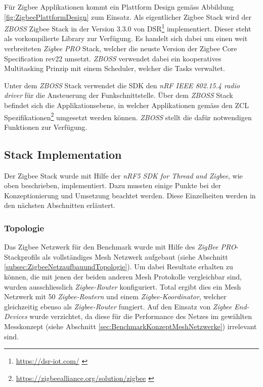 Für Zigbee Applikationen kommt ein Plattform Design gemäss Abbildung \ref{fig:ZigbeePlattformDesign} zum Einsatz. 
Als eigentlicher Zigbee Stack wird der \textit{ZBOSS} Zigbee Stack in der Version 3.3.0 von DSR\footnote{\url{https://dsr-iot.com/} \cite{dsr_corporation_dsr_nodate}} implementiert.
Dieser steht als vorkompilierte Library zur Verfügung. 
Es handelt sich dabei um einen weit verbreiteten \textit{Zigbee PRO} Stack, welcher die neuste Version der Zigbee Core Specification rev22 umsetzt.
\textit{ZBOSS} verwendet dabei ein kooperatives Multitasking Prinzip mit einem Scheduler, welcher die Tasks verwaltet.

Unter dem \textit{ZBOSS} Stack verwendet die SDK den \textit{nRF IEEE 802.15.4 radio driver} für die Ansteuerung der Funkschnittstelle.
Über dem \textit{ZBOSS} Stack befindet sich die Applikationsebene, in welcher Applikationen gemäss den ZCL Spezifikationen\footnote{\url{https://zigbeealliance.org/solution/zigbee} \cite{the_zigbee_alliance_zigbee_2016}} umgesetzt werden können.
\textit{ZBOSS} stellt die dafür notwendigen Funktionen zur Verfügung.


\subsection{Stack Implementation}\label{subsec:ZigbeeStackImplementation}
Der Zigbee Stack wurde mit Hilfe der \textit{nRF5 SDK for Thread and Zigbee}, wie oben beschrieben, implementiert.
Dazu mussten einige Punkte bei der Konzeptionierung und Umsetzung beachtet werden.
Diese Einzelheiten werden in den nächsten Abschnitten erläutert.

\subsubsection{Topologie}\label{subsubsec:ZigbeeTopologie}
Das Zigbee Netzwerk für den Benchmark wurde mit Hilfe des \textit{ZigBee PRO}-Stackprofils als vollständiges Mesh Netzwerk aufgebaut (siehe Abschnitt \ref{subsec:ZigbeeNetzaufbauundTopologie}).
Um dabei Resultate erhalten zu können, die mit jenen der beiden anderen Mesh Protokolle vergleichbar sind, wurden ausschliesslich \textit{Zigbee-Router} konfiguriert.
Total ergibt dies ein Mesh Netzwerk mit 50 \textit{Zigbee-Routern} und einem \textit{Zigbee-Koordinator}, welcher gleichzeitig ebenso als \textit{Zigbee-Router} fungiert.
Auf den Einsatz von \textit{Zigbee End-Devices} wurde verzichtet, da diese für die Performance des Netzes im gewählten Messkonzept (siehe Abschnitt \ref{sec:BenchmarkKonzeptMeshNetzwerke}) irrelevant sind.

